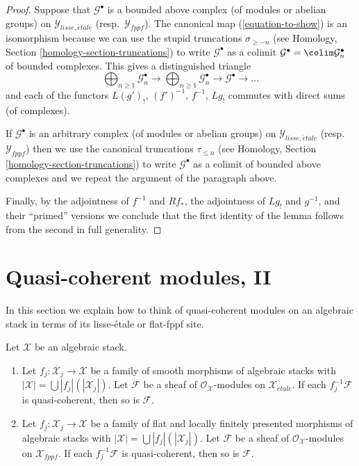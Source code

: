 \begin{proof}
\medskip\noindent
Suppose that $\mathcal{G}^\bullet$ is a bounded above complex
(of modules or abelian groups) on
$\mathcal{Y}_{lisse,\acute{e}tale}$ (resp.\ $\mathcal{Y}_{fppf}$).
The canonical map (\ref{equation-to-show})
is an isomorphism because we can use the stupid truncations
$\sigma_{\geq -n}$ (see
Homology, Section \ref{homology-section-truncations}) to write
$\mathcal{G}^\bullet$ as a colimit
$\mathcal{G}^\bullet = \colim \mathcal{G}_n^\bullet$
of bounded complexes. This gives a distinguished triangle
$$
\bigoplus\nolimits_{n \geq 1} \mathcal{G}_n^\bullet \to
\bigoplus\nolimits_{n \geq 1} \mathcal{G}_n^\bullet \to
\mathcal{G}^\bullet \to \ldots
$$
and each of the functors $L(g')_!$, $(f')^{-1}$, $f^{-1}$, $Lg_!$
commutes with direct sums (of complexes).

\medskip\noindent
If $\mathcal{G}^\bullet$ is an arbitrary complex
(of modules or abelian groups) on
$\mathcal{Y}_{lisse,\acute{e}tale}$ (resp.\ $\mathcal{Y}_{fppf}$)
then we use the canonical truncations $\tau_{\leq n}$ (see
Homology, Section \ref{homology-section-truncations})
to write $\mathcal{G}^\bullet$ as a colimit of bounded above complexes
and we repeat the argument of the paragraph above.

\medskip\noindent
Finally, by the adjointness of
$f^{-1}$ and $Rf_*$, the adjointness of $Lg_!$ and $g^{-1}$, and
their ``primed'' versions we conclude that the first
identity of the lemma follows from the second in full generality.
\end{proof}



\section{Quasi-coherent modules, II}
\label{section-quasi-coherent-modules-II}

\noindent
In this section we explain how to think of quasi-coherent modules
on an algebraic stack in terms of its lisse-\'etale or flat-fppf site.

\begin{lemma}
\label{lemma-check-qc-on-etale-covering}
Let $\mathcal{X}$ be an algebraic stack.
\begin{enumerate}
\item Let $f_j : \mathcal{X}_j \to \mathcal{X}$ be a family of smooth
morphisms of algebraic stacks with
$|\mathcal{X}| =\bigcup |f_j|(|\mathcal{X}_j|)$.
Let $\mathcal{F}$ be a sheaf of $\mathcal{O}_\mathcal{X}$-modules
on $\mathcal{X}_{\acute{e}tale}$. If each $f_j^{-1}\mathcal{F}$
is quasi-coherent, then so is $\mathcal{F}$.
\item Let $f_j : \mathcal{X}_j \to \mathcal{X}$ be a family of flat and
locally finitely presented morphisms of algebraic stacks with
$|\mathcal{X}| =\bigcup |f_j|(|\mathcal{X}_j|)$.
Let $\mathcal{F}$ be a sheaf of $\mathcal{O}_\mathcal{X}$-modules
on $\mathcal{X}_{fppf}$. If each $f_j^{-1}\mathcal{F}$
is quasi-coherent, then so is $\mathcal{F}$.
\end{enumerate}
\end{lemma}

